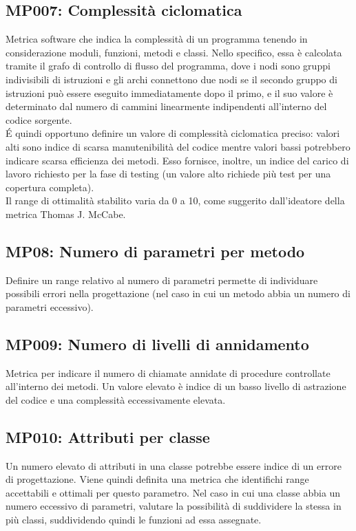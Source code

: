 \subsection{MP007: Complessità ciclomatica}
Metrica software che indica la complessità di un programma tenendo in considerazione moduli, funzioni, metodi e classi.
Nello specifico, essa è calcolata tramite il grafo di controllo di flusso del programma, dove i nodi sono gruppi indivisibili di istruzioni e gli archi connettono due nodi se il secondo gruppo di istruzioni può essere eseguito immediatamente dopo il primo, e il suo valore è determinato dal numero di cammini linearmente indipendenti all'interno del codice sorgente.\\
\'E quindi opportuno definire un valore di complessità ciclomatica preciso: valori alti sono indice di scarsa manutenibilità del codice mentre valori bassi potrebbero indicare scarsa efficienza dei metodi.
Esso fornisce, inoltre, un indice del carico di lavoro richiesto per la fase di testing (un valore alto richiede più test per una copertura completa).\\
Il range di ottimalità stabilito varia da 0 a 10, come suggerito dall'ideatore della metrica Thomas J. McCabe.  

\subsection{MP08: Numero di parametri per metodo}
Definire un range relativo al numero di parametri permette di individuare possibili errori nella progettazione (nel caso in cui un metodo abbia un numero di parametri eccessivo).

\subsection{MP009: Numero di livelli di annidamento}
Metrica per indicare il numero di chiamate annidate di procedure controllate all'interno dei metodi.\newline
Un valore elevato è indice di un basso livello di astrazione del codice e una complessità eccessivamente elevata. 

\subsection{MP010: Attributi per classe}
Un numero elevato di attributi in una classe potrebbe essere indice di un errore di progettazione.
Viene quindi definita una metrica che identifichi range accettabili e ottimali per questo parametro.
Nel caso in cui una classe abbia un numero eccessivo di parametri, valutare la possibilità di suddividere la stessa in più classi, suddividendo quindi le funzioni ad essa assegnate.

